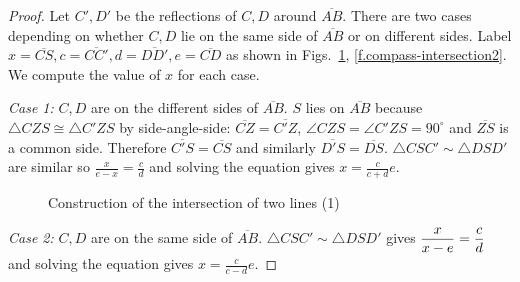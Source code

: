 \begin{proof}
Let $C',D'$ be the reflections of $C,D$ around $\overline{AB}$.
There are two cases depending on whether $C,D$ lie on the same side of $\overline{AB}$ or on different sides. Label $x=\overline{CS}, c=\overline{CC'}, d=\overline{DD'}, e=\overline{CD}$ as shown in Figs.~\ref{f.compass-intersection1}, \ref{f.compass-intersection2}. We compute the value of $x$ for each case.

\textit{Case 1:}
$C,D$ are on the different sides of $\overline{AB}$.
$S$ lies on $\overline{AB}$ because $\triangle CZS\cong \triangle C'ZS$ by side-angle-side: $\overline{CZ}=\overline{C'Z}$, $\angle CZS=\angle C'ZS=90^\circ$ and $\overline{ZS}$ is a common side. Therefore $\overline{C'S}=\overline{CS}$ and similarly $\overline{D'S}=\overline{DS}$. $\triangle CSC'\sim\triangle DSD'$ are similar so $\displaystyle\frac{x}{e-x} = \displaystyle\frac{c}{d}$ and solving the equation gives $x=\displaystyle\frac{c}{c+d}e$.

\begin{figure}[ht]
\begin{center}
\end{center}
\caption{Construction of  the intersection of two lines (1)}\label{f.compass-intersection1}
\end{figure}

\textit{Case 2:}
$C,D$ are on the same side of $\overline{AB}$. $\triangle CSC'\sim\triangle DSD'$ gives $\displaystyle\frac{x}{x-e}=\frac{c}{d}\displaystyle$ and solving the equation gives $x=\displaystyle\frac{c}{c-d}e$.


\end{proof}
